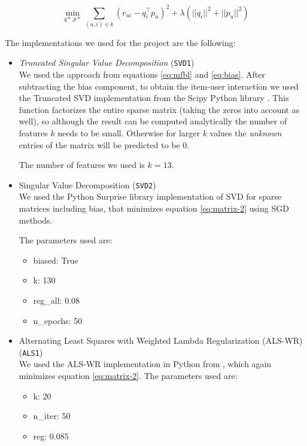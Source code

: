 \documentclass[10pt,conference,compsocconf]{IEEEtran}
\begin{document}
      \begin{equation}
        \label{eq:matrix-2}
        \min_{q*.p*} \sum_{(u,i) \in k} (r_{ui} - q_i^\top p_u)^2 + \lambda(||q_i||^2 + ||p_u||^2)
      \end{equation}

      The implementations we used for the project are the following:

      \begin{itemize}
        \item \emph{Truncated Singular Value Decomposition} (\texttt{SVD1})\\
          We used the approach from equations \ref{eq:mfbl} and \ref{eq:bias}. After subtracting the bias component, to obtain the item-user interaction we used the Truncated SVD implementation from the Scipy Python library \cite{scipy}. This function factorizes the entire sparse matrix (taking the zeros into account as well), so although the result can be computed analytically the number of features $k$ needs to be small. Otherwise for larger $k$ values the \emph{unknown} entries of the matrix will be predicted to be 0.

          The number of features we used is $k=13$.
        \item Singular Value Decomposition (\texttt{SVD2})\\
          We used the Python Surprise library \cite{surprise} implementation of SVD for sparse matrices including bias, that minimizes equation \ref{eq:matrix-2} using SGD methods.

          The parameters used are:
          \begin{itemize}
            \item biased: True
            \item k: 130
            \item reg\_all: 0.08
            \item n\_epochs: 50
          \end{itemize}

        \item Alternating Least Squares with Weighted Lambda Regularization (ALS-WR) (\texttt{ALS1})\\
          We used the ALS-WR implementation in Python from \cite{recommend}, which again minimizes equation \ref{eq:matrix-2}. The parameters used are:
          \begin{itemize}
            \item k: 20
            \item n\_iter: 50
            \item reg: 0.085
          \end{itemize}


\end{itemize}
\end{document}
